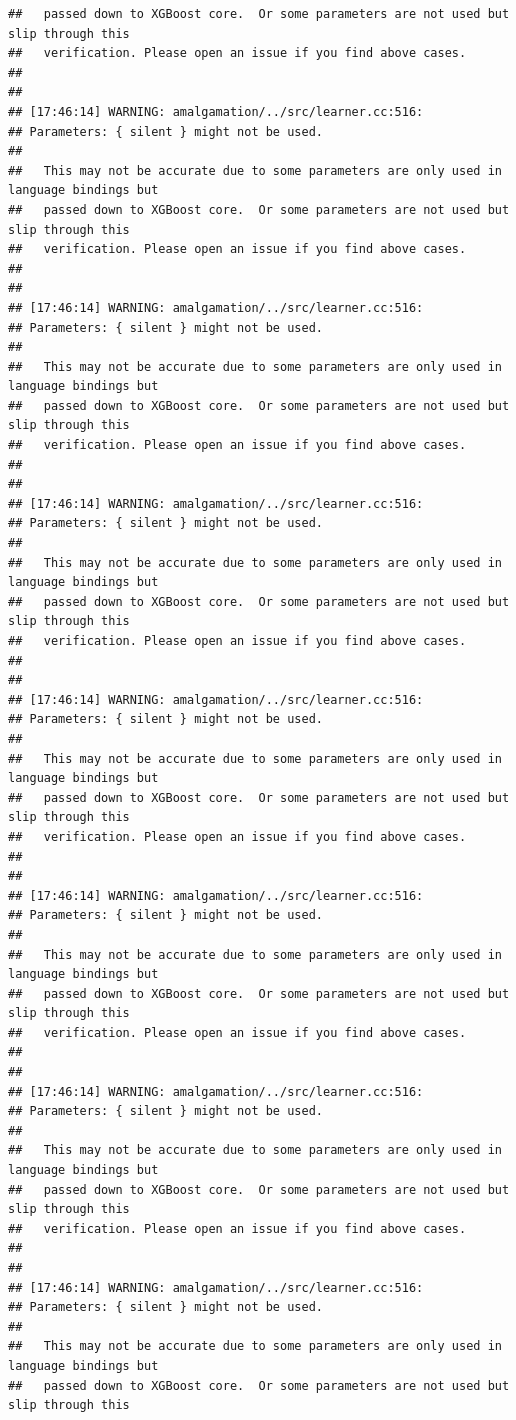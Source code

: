 \documentclass[AMS,STIX2COL]{WileyNJD-v2}\usepackage[]{graphicx}\usepackage[]{color}
\makeatletter
\newenvironment{kframe}{%
 \def\at@end@of@kframe{}%
 \ifinner\ifhmode%
  \def\at@end@of@kframe{\end{minipage}}%
  \begin{minipage}{\columnwidth}%
 \fi\fi%
 \def\FrameCommand##1{\hskip\@totalleftmargin \hskip-\fboxsep
 \colorbox{shadecolor}{##1}\hskip-\fboxsep
     \hskip-\linewidth \hskip-\@totalleftmargin \hskip\columnwidth}%
 \MakeFramed {\advance\hsize-\width
   \@totalleftmargin\z@ \linewidth\hsize
   \@setminipage}}%
 {\par\unskip\endMakeFramed%
 \at@end@of@kframe}
\newenvironment{knitrout}{}{} %
\makeatother
\begin{document}
\begin{knitrout}
\begin{kframe}
\begin{verbatim}
##   passed down to XGBoost core.  Or some parameters are not used but slip through this
##   verification. Please open an issue if you find above cases.
## 
## 
## [17:46:14] WARNING: amalgamation/../src/learner.cc:516: 
## Parameters: { silent } might not be used.
## 
##   This may not be accurate due to some parameters are only used in language bindings but
##   passed down to XGBoost core.  Or some parameters are not used but slip through this
##   verification. Please open an issue if you find above cases.
## 
## 
## [17:46:14] WARNING: amalgamation/../src/learner.cc:516: 
## Parameters: { silent } might not be used.
## 
##   This may not be accurate due to some parameters are only used in language bindings but
##   passed down to XGBoost core.  Or some parameters are not used but slip through this
##   verification. Please open an issue if you find above cases.
## 
## 
## [17:46:14] WARNING: amalgamation/../src/learner.cc:516: 
## Parameters: { silent } might not be used.
## 
##   This may not be accurate due to some parameters are only used in language bindings but
##   passed down to XGBoost core.  Or some parameters are not used but slip through this
##   verification. Please open an issue if you find above cases.
## 
## 
## [17:46:14] WARNING: amalgamation/../src/learner.cc:516: 
## Parameters: { silent } might not be used.
## 
##   This may not be accurate due to some parameters are only used in language bindings but
##   passed down to XGBoost core.  Or some parameters are not used but slip through this
##   verification. Please open an issue if you find above cases.
## 
## 
## [17:46:14] WARNING: amalgamation/../src/learner.cc:516: 
## Parameters: { silent } might not be used.
## 
##   This may not be accurate due to some parameters are only used in language bindings but
##   passed down to XGBoost core.  Or some parameters are not used but slip through this
##   verification. Please open an issue if you find above cases.
## 
## 
## [17:46:14] WARNING: amalgamation/../src/learner.cc:516: 
## Parameters: { silent } might not be used.
## 
##   This may not be accurate due to some parameters are only used in language bindings but
##   passed down to XGBoost core.  Or some parameters are not used but slip through this
##   verification. Please open an issue if you find above cases.
## 
## 
## [17:46:14] WARNING: amalgamation/../src/learner.cc:516: 
## Parameters: { silent } might not be used.
## 
##   This may not be accurate due to some parameters are only used in language bindings but
##   passed down to XGBoost core.  Or some parameters are not used but slip through this

\end{verbatim}
\end{kframe}
\end{knitrout}
\end{document}
